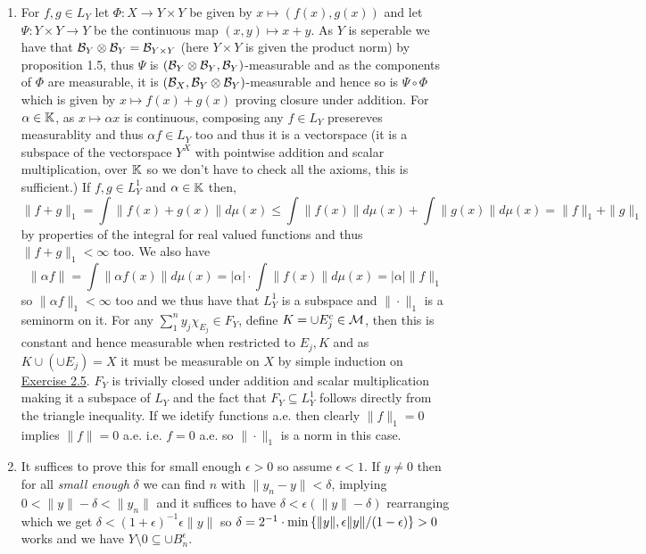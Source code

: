 \documentclass[12pt,a4paper]{article}
\begin{document}
\begin{solution}
\begin{enumerate}[label=\alph*.]
\item For $f,g\in L_Y$ let $\Phi:X\to Y\times Y$ be given by $x\mapsto (f(x),g(x))$ and let $\Psi:Y\times Y\to Y$ be the continuous map $(x,y)\mapsto x+y.$ 
    As $Y$ is seperable we have that $\mathcal{B}_Y\otimes\mathcal{B}_Y=\mathcal{B}_{Y\times Y}$ (here $Y\times Y$ is given the product norm) by proposition 1.5, thus $\Psi$ is $(\mathcal{B}_Y\otimes \mathcal{B}_Y,\mathcal{B}_Y)$-measurable and as the components of $\Phi$ are measurable, it is $(\mathcal{B}_X,\mathcal{B}_Y\otimes\mathcal{B}_Y)$-measurable and hence so is $\Psi\circ\Phi$ which is given by $x\mapsto f(x)+g(x)$ proving closure under addition. 
    For $\alpha\in\mathbb{K}$, as $x\mapsto\alpha x$ is continuous, composing any $f\in L_Y$ presereves measurablity and thus $\alpha f\in L_Y$ too and thus it is a vectorspace (it is a subspace of the vectorspace $Y^X$ with pointwise addition and scalar multiplication, over $\mathbb{K}$ so we don't have to check all the axioms, this is sufficient.) 
    If $f,g\in L_Y^1$ and $\alpha\in\mathbb{K}$ then, 
    \[
        \|f+g\|_1=\int\|f(x)+g(x)\|d\mu(x)\leq\int\|f(x)\|d\mu(x)+\int\|g(x)\|d\mu(x)=\|f\|_1+\|g\|_1
    \]
    by properties of the integral for real valued functions and thus $\|f+g\|_1<\infty$ too. 
    We also have 
    \[
        \|\alpha f\|=\int\|\alpha f(x)\|d\mu(x)=|\alpha|\cdot\int\|f(x)\|d\mu(x)=|\alpha|\|f\|_1
    \]
    so $\|\alpha f\|_1<\infty$ too and we thus have that $L_Y^1$ is a subspace and $\|\cdot\|_1$ is a seminorm on it. 
    For any $\sum_1^ny_j\chi_{E_j}\in F_Y$, define $K=\cup E_j^c\in\mathcal{M}$, then this is constant and hence measurable when restricted to $E_j,K$ and as $K\cup(\cup E_j)=X$ it must be measurable on $X$ by simple induction on \hyperref[prob:2-5]{Exercise 2.5}. 
    $F_Y$ is trivially closed under addition and scalar multiplication making it a subspace of $L_Y$ and the fact that $F_Y \subseteq L_Y^1$ follows directly from the triangle inequality. 
    If we idetify functions a.e. then clearly $\|f\|_1=0$ implies $\|f\|=0$ a.e. i.e. $f=0$ a.e. so $\|\cdot\|_1$ is a norm in this case. 
\item It suffices to prove this for small enough $\epsilon>0$ so assume $\epsilon<1$. 
    If $y\neq 0$ then for all \textit{small enough} $\delta$ we can find $n$ with $\|y_n-y\|<\delta$, implying $0<\|y\|-\delta<\|y_n\|$ and it suffices to have $\delta<\epsilon(\|y\|-\delta)$ rearranging which we get $\delta<(1+\epsilon)^{-1}\epsilon\|y\|$ so $\delta=2^{-1}\cdot\min \qty{\|y\|,\epsilon\|y\|/(1-\epsilon)}>0$ works and we have $Y\setminus \qty{0} \subseteq\cup B_n^\epsilon.$ 

\end{enumerate}
\end{solution}
\end{document}

